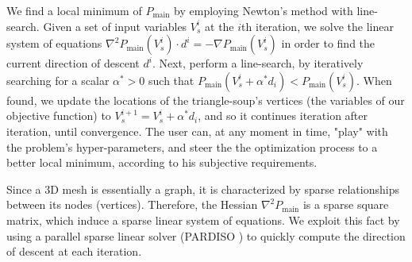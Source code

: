 \noindent We find a local minimum of $P_{\mathrm{main}}$ by employing Newton's method with line-search. Given a set of input variables $V_s^i$ at the $i$th iteration, we solve the linear system of equations $\nabla^2 P_{\mathrm{main}}\left(V_s^i\right) \cdot d^i = -\nabla P_{\mathrm{main}}\left(V_s^i\right)$ in order to find the current direction of descent $d^i$. Next, perform a line-search, by iteratively searching for a scalar $\alpha^* > 0$ such that $P_{\mathrm{main}}\left(V_s^i + \alpha^* d_i\right) < P_{\mathrm{main}}\left(V_s^i\right)$. When found, we update the locations of the triangle-soup's vertices (the variables of our objective function) to $V_s^{i+1} = V_s^i + \alpha^* d_i$, and so it continues iteration after iteration, until convergence. The user can, at any moment in time, "play" with the problem's hyper-parameters, and steer the the optimization process to a better local minimum, according to his subjective requirements.

\noindent Since a 3D mesh is essentially a graph, it is characterized by sparse relationships between its nodes (vertices). Therefore, the Hessian $\nabla^2 P_{\mathrm{main}}$ is a sparse square matrix, which induce a sparse linear system of equations. We exploit this fact by using a parallel sparse linear solver (PARDISO \cite{SCHENK200169}) to quickly compute the direction of descent at each iteration. 
